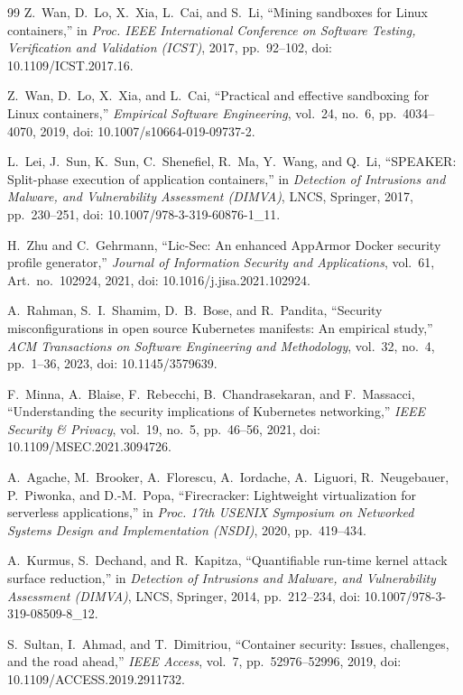 \begin{thebibliography}{99}
 Z.~Wan, D.~Lo, X.~Xia, L.~Cai, and S.~Li, ``Mining sandboxes for Linux containers,'' in \emph{Proc. IEEE International Conference on Software Testing, Verification and Validation (ICST)}, 2017, pp.~92--102, doi: 10.1109/ICST.2017.16.

 Z.~Wan, D.~Lo, X.~Xia, and L.~Cai, ``Practical and effective sandboxing for Linux containers,'' \emph{Empirical Software Engineering}, vol.~24, no.~6, pp.~4034--4070, 2019, doi: 10.1007/s10664-019-09737-2.

 L.~Lei, J.~Sun, K.~Sun, C.~Shenefiel, R.~Ma, Y.~Wang, and Q.~Li, ``SPEAKER: Split-phase execution of application containers,'' in \emph{Detection of Intrusions and Malware, and Vulnerability Assessment (DIMVA)}, LNCS, Springer, 2017, pp.~230--251, doi: 10.1007/978-3-319-60876-1\_11.

 H.~Zhu and C.~Gehrmann, ``Lic-Sec: An enhanced AppArmor Docker security profile generator,'' \emph{Journal of Information Security and Applications}, vol.~61, Art.~no.~102924, 2021, doi: 10.1016/j.jisa.2021.102924.

 A.~Rahman, S.~I.~Shamim, D.~B.~Bose, and R.~Pandita, ``Security misconfigurations in open source Kubernetes manifests: An empirical study,'' \emph{ACM Transactions on Software Engineering and Methodology}, vol.~32, no.~4, pp.~1--36, 2023, doi: 10.1145/3579639.

 F.~Minna, A.~Blaise, F.~Rebecchi, B.~Chandrasekaran, and F.~Massacci, ``Understanding the security implications of Kubernetes networking,'' \emph{IEEE Security \& Privacy}, vol.~19, no.~5, pp.~46--56, 2021, doi: 10.1109/MSEC.2021.3094726.

 A.~Agache, M.~Brooker, A.~Florescu, A.~Iordache, A.~Liguori, R.~Neugebauer, P.~Piwonka, and D.-M.~Popa, ``Firecracker: Lightweight virtualization for serverless applications,'' in \emph{Proc. 17th USENIX Symposium on Networked Systems Design and Implementation (NSDI)}, 2020, pp.~419--434.

 A.~Kurmus, S.~Dechand, and R.~Kapitza, ``Quantifiable run-time kernel attack surface reduction,'' in \emph{Detection of Intrusions and Malware, and Vulnerability Assessment (DIMVA)}, LNCS, Springer, 2014, pp.~212--234, doi: 10.1007/978-3-319-08509-8\_12.

 S.~Sultan, I.~Ahmad, and T.~Dimitriou, ``Container security: Issues, challenges, and the road ahead,'' \emph{IEEE Access}, vol.~7, pp.~52976--52996, 2019, doi: 10.1109/ACCESS.2019.2911732.


\end{thebibliography}
